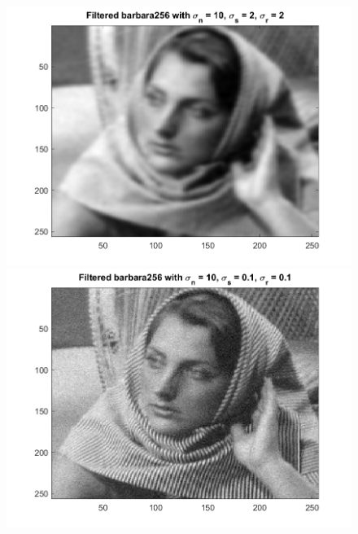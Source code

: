 \documentclass{article}
\begin{document}
\begin{figure}[!htb]
    \centering
    \begin{minipage}[b]{0.3\textwidth}
        \includegraphics[width=\textwidth]{barbara256_10_2_2_13.png}
    \end{minipage}
    \begin{minipage}[b]{0.3\textwidth}
        \includegraphics[width=\textwidth]{barbara256_10_0.1_0.1_15.png}
    \end{minipage}
    \begin{minipage}[b]{0.3\textwidth}

\end{minipage}
\end{figure}
\end{document}
